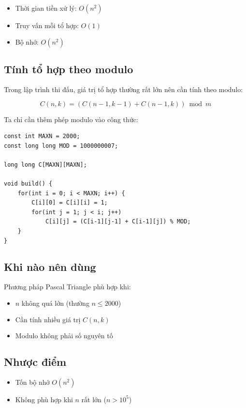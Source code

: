\begin{itemize}
\item Thời gian tiền xử lý: $O(n^2)$
\item Truy vấn mỗi tổ hợp: $O(1)$
\item Bộ nhớ: $O(n^2)$
\end{itemize}

\subsection*{Tính tổ hợp theo modulo}

Trong lập trình thi đấu, giá trị tổ hợp thường rất lớn nên cần tính theo modulo:

\[
C(n,k) = (C(n-1,k-1) + C(n-1,k)) \bmod m
\]

Ta chỉ cần thêm phép modulo vào công thức:

\begin{tcolorbox}
\begin{verbatim}
const int MAXN = 2000;
const long long MOD = 1000000007;

long long C[MAXN][MAXN];

void build() {
    for(int i = 0; i < MAXN; i++) {
        C[i][0] = C[i][i] = 1;
        for(int j = 1; j < i; j++)
            C[i][j] = (C[i-1][j-1] + C[i-1][j]) % MOD;
    }
}
\end{verbatim}
\end{tcolorbox}

\subsection*{Khi nào nên dùng}

Phương pháp Pascal Triangle phù hợp khi:

\begin{itemize}
\item $n$ không quá lớn (thường $n \le 2000$)
\item Cần tính nhiều giá trị $C(n,k)$
\item Modulo không phải số nguyên tố
\end{itemize}

\subsection*{Nhược điểm}

\begin{itemize}
\item Tốn bộ nhớ $O(n^2)$
\item Không phù hợp khi $n$ rất lớn ($n > 10^5$)
\end{itemize}

